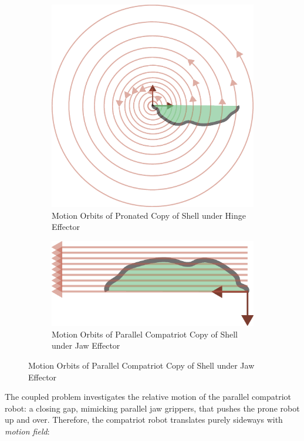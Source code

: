 \documentclass[letterpaper]{report}
\begin{document}
\begin{figure}[ht]
  \begin{subfigure}[t]{0.5\textwidth}
    \centering
    \includegraphics[width=\linewidth,trim={10cm 5cm 0 5cm},clip]{ShapeForContact_hinge2.eps}
    \caption{\label{fig:rotMot}Motion Orbits of Pronated Copy of Shell under Hinge Effector}
  \end{subfigure}
  \begin{subfigure}[t]{0.5\textwidth}
    \centering
    \includegraphics[width=\linewidth]{ShapeForContact_jaw.eps}
    \caption{\label{fig:transMot}Motion Orbits of Parallel Compatriot Copy of Shell under Jaw Effector}
  \end{subfigure}
\end{figure}

The coupled problem investigates the relative motion of the parallel compatriot robot: a closing gap, mimicking parallel jaw grippers, that pushes the prone robot up and over.
Therefore, the compatriot robot translates purely sideways with \textit{motion field}:
\end{document}

